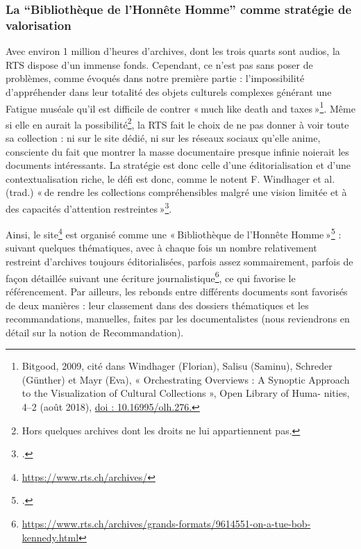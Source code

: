 \subsubsection{La \enquote{Bibliothèque de l'Honnête Homme} comme stratégie de valorisation }


Avec environ 1 million d’heures d’archives, dont les trois quarts sont audios, la RTS dispose d’un immense fonds. Cependant, ce n’est pas sans poser de problèmes, comme évoqués dans notre première partie : l’impossibilité d’appréhender dans leur totalité des objets culturels complexes générant une Fatigue muséale qu’il est difficile de contrer « much like death and taxes »\footnote{Bitgood, 2009, cité dans Windhager (Florian), Salisu (Saminu), Schreder (Günther) et Mayr (Eva), « Orchestrating Overviews : A
	Synoptic Approach to the Visualization of Cultural Collections », Open Library of Huma-
	nities, 4–2 (août 2018), \url{doi : 10.16995/olh.276.}}. Même si elle en aurait la possibilité\footnote{Hors quelques archives dont les droits ne lui appartiennent pas.}, la RTS fait le choix de ne pas donner à voir toute sa collection : ni sur le site dédié, ni sur les réseaux sociaux qu’elle anime, consciente du fait que montrer la masse documentaire presque infinie noierait les documents intéressants. La stratégie est donc celle d’une éditorialisation et d’une contextualisation riche, le défi est donc, comme le notent F. Windhager et al. (trad.) « de rendre les collections compréhensibles malgré une vision limitée et à des capacités d’attention restreintes »\footcite[p. 3]{windhager2018a}.

Ainsi, le site\footnote{\url{ https://www.rts.ch/archives/}} est organisé comme une « Bibliothèque de l’Honnête Homme »\footcite{chatelain2003} : suivant quelques thématiques, avec à chaque fois un nombre relativement restreint d’archives toujours éditorialisées, parfois assez sommairement, parfois de façon détaillée suivant une écriture journalistique\footnote{\url{ https://www.rts.ch/archives/grands-formats/9614551-on-a-tue-bob-kennedy.html}}, ce qui favorise le référencement. Par ailleurs, les rebonds entre différents documents sont favorisés de deux manières : leur classement dans des dossiers thématiques et les recommandations, manuelles, faites par les documentalistes (nous reviendrons en détail sur la notion de Recommandation).


